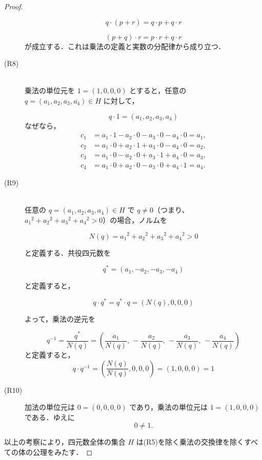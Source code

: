 \documentclass[a4paper,10pt,fleqn]{ltjsarticle}
\begin{document}
\begin{leftbar}
\begin{proof}
\begin{description}
                  \[
                      q \cdot (p + r) = q \cdot p + q \cdot r
                  \]

                  \[
                      (p + q) \cdot r = p \cdot r + q \cdot r
                  \]
                  が成立する．これは乗法の定義と実数の分配律から成り立つ．
            \item [(R8)] \mbox{} \\
                  乗法の単位元を $1 = (1, 0, 0, 0)$ とすると，任意の $q = (a_1, a_2, a_3, a_4) \in H$ に対して，

                  \[
                      q \cdot 1 = (a_1, a_2, a_3, a_4)
                  \]
                  なぜなら，
                  \begin{align*}
                      c_1 & = a_1 \cdot 1 - a_2 \cdot 0 - a_3 \cdot 0 - a_4 \cdot 0 = a_1, \\
                      c_2 & = a_1 \cdot 0 + a_2 \cdot 1 + a_3 \cdot 0 - a_4 \cdot 0 = a_2, \\
                      c_3 & = a_1 \cdot 0 - a_2 \cdot 0 + a_3 \cdot 1 + a_4 \cdot 0 = a_3, \\
                      c_4 & = a_1 \cdot 0 + a_2 \cdot 0 - a_3 \cdot 0 + a_4 \cdot 1 = a_4.
                  \end{align*}
            \item [(R9)] \mbox{} \\
                  任意の $q = (a_1, a_2, a_3, a_4) \in H$ で $q \ne 0$（つまり、${a_1}^2 + {a_2}^2 + {a_3}^2 + {a_4}^2 > 0$）の場合，ノルムを

                  \[
                      N(q) = {a_1}^2 + {a_2}^2 + {a_3}^2 + {a_4}^2 > 0
                  \]

                  と定義する．共役四元数を

                  \[
                      q^* = (a_1, -a_2, -a_3, -a_4)
                  \]

                  と定義すると，

                  \[
                      q \cdot q^* = q^* \cdot q = (N(q), 0, 0, 0)
                  \]

                  よって，乗法の逆元を

                  \[
                      q^{-1} = \frac{q^*}{N(q)} = \left( \frac{a_1}{N(q)},\, -\frac{a_2}{N(q)},\, -\frac{a_3}{N(q)},\, -\frac{a_4}{N(q)} \right)
                  \]
                  と定義すると，
                  \[
                      q \cdot q^{-1} = \left( \frac{N(q)}{N(q)}, 0, 0, 0 \right) = (1, 0, 0, 0) = 1
                  \]
            \item [(R10)]
                  加法の単位元は $0 = (0, 0, 0, 0)$ であり，乗法の単位元は $1 = (1, 0, 0, 0)$ である．ゆえに
                  \[
                      0 \ne 1.
                  \]
        \end{description}
        以上の考察により，四元数全体の集合 $H$ は(R5)を除く乗法の交換律を除くすべての体の公理をみたす．
    \end{proof}
\end{leftbar}
\newpage
\end{document}
